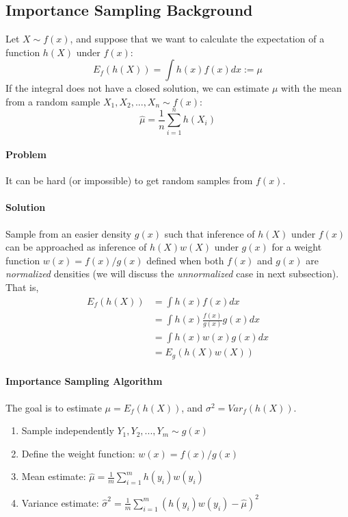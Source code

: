 \documentclass[useAMS,usenatbib]{biom}
\begin{document}
\appendix

\section{}
\subsection{Importance Sampling Background}
\label{background}

Let $X \sim f(x)$, and suppose that we want to calculate the
expectation of a function $h(X)$ under $f(x)$:
\begin{equation}
E_f(h(X)) = \int h(x) f(x) dx := \mu
\end{equation}
If the integral does not have a closed solution, we can estimate $\mu$
with the mean from a random sample $X_1,X_2,...,X_n \sim f(x)$:
\begin{equation}
\hat{\mu} = \frac{1}{n} \sum_{i=1}^n h(X_i)
\end{equation}

\paragraph{Problem} It can be hard (or impossible) to get random samples
from $f(x)$.

\paragraph{Solution} Sample from an easier density $g(x)$ such that inference of $h(X)$ under $f(x)$ can be approached as
inference of $h(X)w(X)$ under $g(x)$ for a weight function
$w(x)=f(x)/g(x)$ defined when both $f(x)$ and $g(x)$ are \textit{normalized} densities (we will discuss the
    \textit{unnormalized} case in next subsection). That is,
\begin{eqnarray*}
E_f(h(X)) &= \int h(x) f(x) dx \\ 
&= \int h(x) \frac{f(x)}{g(x)} g(x) dx \\
&= \int h(x) w(x) g(x) dx \\
&= E_g(h(X)w(X))
\end{eqnarray*}

\paragraph{Importance Sampling Algorithm} The goal is to estimate
$\mu = E_f(h(X))$, and $\sigma^2 = Var_f(h(X))$.
\begin{enumerate}
\item{Sample independently $Y_1,Y_2,...,Y_m \sim g(x)$}
\item{Define the weight function: $w(x) = f(x)/g(x)$}
\item{Mean estimate: $\hat{\mu} = \frac{1}{m} \sum_{i=1}^m
    h(y_i)w(y_i)$}
\item{Variance estimate: $\hat{\sigma}^2 = \frac{1}{m} \sum_{i=1}^m
    (h(y_i)w(y_i) - \hat{\mu})^2$}
\end{enumerate}
\end{document}
